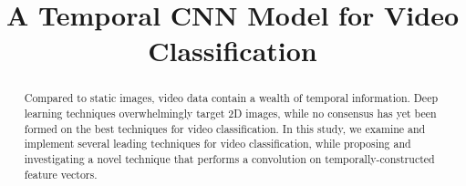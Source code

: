 \documentclass[conference]{IEEEtran}
\begin{document}
\title{A Temporal CNN Model for Video Classification}
\author{
}
\maketitle
\begin{abstract}
Compared to static images, video data contain a wealth of temporal information.
Deep learning techniques overwhelmingly target 2D images, while no consensus has yet been formed on the best techniques for video classification. In this study, we examine and implement several leading techniques for video classification, while proposing and investigating a novel technique that performs a convolution on temporally-constructed feature vectors.
\end{abstract}



\end{document}
